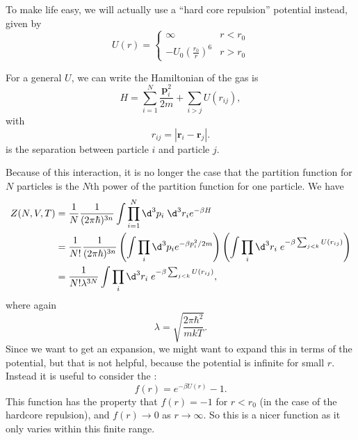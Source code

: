 \documentclass[a4paper]{article}
\begin{document}
\begin{eg}
\begin{center}
\begin{tikzpicture}
    \end{tikzpicture}
  \end{center}
  To make life easy, we will actually use a ``hard core repulsion'' potential instead, given by
  \[
    U(r) =
    \begin{cases}
      \infty & r < r_0\\
      -U_0 \left(\frac{r_0}{r}\right)^6 & r > r_0
    \end{cases}
  \]
  \begin{center}
  \end{center}
\end{eg}
For a general $U$, we can write the Hamiltonian of the gas is
\[
  H = \sum_{i = 1}^N \frac{\mathbf{p}_i^2}{2m} + \sum_{i > j} U(r_{ij}),
\]
with
\[
  r_{ij} = |\mathbf{r}_i - \mathbf{r}_j|.
\]
is the separation between particle $i$ and particle $j$.

Because of this interaction, it is no longer the case that the partition function for $N$ particles is the $N$th power of the partition function for one particle. We have
\begin{align*}
  Z(N, V, T) &= \frac{1}{N} \frac{1}{(2\pi \hbar)^{3n}} \int \prod_{i = 1}^N \d^3 p_i\; \d^3 r_i e^{-\beta H}\\
  &= \frac{1}{N!} \frac{1}{(2\pi \hbar)^{3n}} \left(\int \prod_{i} \d^3 p_i e^{-\beta p_i^2/2m}\right)\left(\int \prod_i \d^3 r_i\; e^{-\beta \sum_{j < k} U(r_{ij})} \right)\\
  &= \frac{1}{N! \lambda^{3N}} \int \prod_i \d^3 r_i\; e^{-\beta \sum_{j < k} U(r_{ij})},
\end{align*}
where again
\[
  \lambda = \sqrt{\frac{2\pi \hbar^2}{mkT}}.
\]
Since we want to get an expansion, we might want to expand this in terms of the potential, but that is not helpful, because the potential is infinite for small $r$. Instead it is useful to consider the :
\[
  f(r) = e^{-\beta U(r)} - 1.
\]
This function has the property that $f(r) = -1$ for $r < r_0$ (in the case of the hardcore repulsion), and $f(r) \to 0$ as $r \to \infty$. So this is a nicer function as it only varies within this finite range.
\end{document}
